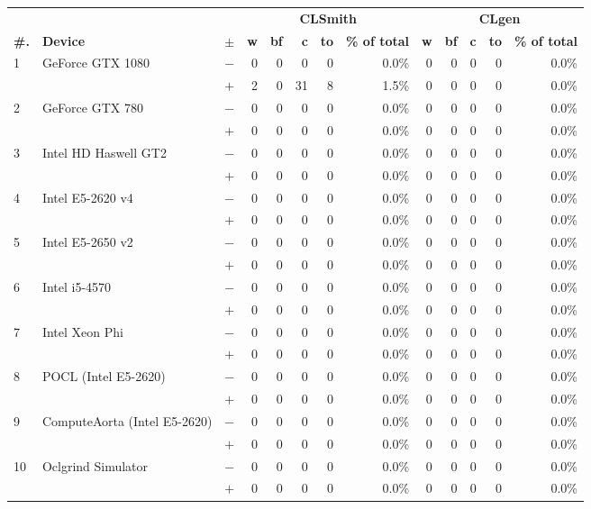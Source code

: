   \begin{tabular}{lll | rrrrr | rrrrr }
  \toprule
  & & & \multicolumn{5}{c|}{\textbf{CLSmith}} & \multicolumn{5}{c}{\textbf{CLgen}} \\
  \textbf{\#.} & \textbf{Device} & $\pm$ &
  \textbf{w} & \textbf{bf} & \textbf{c} & \textbf{to} & \textbf{\% of total} &
  \textbf{w} & \textbf{bf} & \textbf{c} & \textbf{to} & \textbf{\% of total} \\
  \midrule
  \multirow{ 2}{*}{1} & \multirow{ 2}{*}{GeForce GTX 1080} & $-$ & 0 & 0 & 0 & 0 & 0.0\%       & 0 & 0 & 0 & 0 & 0.0\% \\& & $+$ & 2 & 0 & 31 & 8 & 1.5\% & 0 & 0 & 0 & 0 & 0.0\% \\
\hline
\multirow{ 2}{*}{2} & \multirow{ 2}{*}{GeForce GTX 780} & $-$ & 0 & 0 & 0 & 0 & 0.0\%       & 0 & 0 & 0 & 0 & 0.0\% \\& & $+$ & 0 & 0 & 0 & 0 & 0.0\% & 0 & 0 & 0 & 0 & 0.0\% \\
\hline
\multirow{ 2}{*}{3} & \multirow{ 2}{*}{Intel HD Haswell GT2} & $-$ & 0 & 0 & 0 & 0 & 0.0\%       & 0 & 0 & 0 & 0 & 0.0\% \\& & $+$ & 0 & 0 & 0 & 0 & 0.0\% & 0 & 0 & 0 & 0 & 0.0\% \\
\hline
\multirow{ 2}{*}{4} & \multirow{ 2}{*}{Intel E5-2620 v4} & $-$ & 0 & 0 & 0 & 0 & 0.0\%       & 0 & 0 & 0 & 0 & 0.0\% \\& & $+$ & 0 & 0 & 0 & 0 & 0.0\% & 0 & 0 & 0 & 0 & 0.0\% \\
\hline
\multirow{ 2}{*}{5} & \multirow{ 2}{*}{Intel E5-2650 v2} & $-$ & 0 & 0 & 0 & 0 & 0.0\%       & 0 & 0 & 0 & 0 & 0.0\% \\& & $+$ & 0 & 0 & 0 & 0 & 0.0\% & 0 & 0 & 0 & 0 & 0.0\% \\
\hline
\multirow{ 2}{*}{6} & \multirow{ 2}{*}{Intel i5-4570} & $-$ & 0 & 0 & 0 & 0 & 0.0\%       & 0 & 0 & 0 & 0 & 0.0\% \\& & $+$ & 0 & 0 & 0 & 0 & 0.0\% & 0 & 0 & 0 & 0 & 0.0\% \\
\hline
\multirow{ 2}{*}{7} & \multirow{ 2}{*}{Intel Xeon Phi} & $-$ & 0 & 0 & 0 & 0 & 0.0\%       & 0 & 0 & 0 & 0 & 0.0\% \\& & $+$ & 0 & 0 & 0 & 0 & 0.0\% & 0 & 0 & 0 & 0 & 0.0\% \\
\hline
\multirow{ 2}{*}{8} & \multirow{ 2}{*}{POCL (Intel E5-2620)} & $-$ & 0 & 0 & 0 & 0 & 0.0\%       & 0 & 0 & 0 & 0 & 0.0\% \\& & $+$ & 0 & 0 & 0 & 0 & 0.0\% & 0 & 0 & 0 & 0 & 0.0\% \\
\hline
\multirow{ 2}{*}{9} & \multirow{ 2}{*}{ComputeAorta (Intel E5-2620)} & $-$ & 0 & 0 & 0 & 0 & 0.0\%       & 0 & 0 & 0 & 0 & 0.0\% \\& & $+$ & 0 & 0 & 0 & 0 & 0.0\% & 0 & 0 & 0 & 0 & 0.0\% \\
\hline
\multirow{ 2}{*}{10} & \multirow{ 2}{*}{Oclgrind Simulator} & $-$ & 0 & 0 & 0 & 0 & 0.0\%       & 0 & 0 & 0 & 0 & 0.0\% \\& & $+$ & 0 & 0 & 0 & 0 & 0.0\% & 0 & 0 & 0 & 0 & 0.0\% \\
  \bottomrule
\end{tabular}

